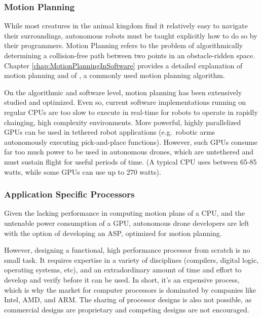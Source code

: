 
    \subsubsection{Motion Planning}
        
        While most creatures in the animal kingdom find it relatively easy to navigate their surroundings, autonomous robots must be taught explicitly how to do so by their programmers. Motion Planning refers to the problem of algorithmically determining a collision-free path between two points in an obstacle-ridden space. Chapter \ref{chap:MotionPlanningInSoftware} provides a detailed explanation of motion planning and of , a commonly used motion planning algorithm.

        On the algorithmic and software level, motion planning has been extensively studied and optimized. Even so, current software implementations running on regular \glspl{CPU} are too slow to execute in \gls{real-time} for robots to operate in rapidly chainging, high complexity environments. More powerful, highly parallelized \glspl{GPU} can be used in tethered robot applications (e.g.\ robotic arms autonomously executing pick-and-place functions). However, such \glspl{GPU} consume far too much power to be used in autonomous drones, which are untethered and must sustain flight for useful periods of time. (A typical \gls{CPU} uses between 65-85 watts, while some \glspl{GPU} can use up to 270 watts).

        
    \subsubsection{Application Specific Processors}

        Given the lacking performance in computing motion plans of a \gls{CPU}, and the untenable power consumption of a \gls{GPU}, autonomous drone developers are left with the option of developing an \gls{ASP}, optimized for motion planning.

        However, designing a functional, high performance processor from scratch is no small task. It requires expertise in a variety of disciplines (compilers, digital logic, operating systems, etc), and an extradordinary amount of time and effort to develop and verify before it can be used. In short, it's an expensive process, which is why the market for computer processors is dominated by companies like Intel, AMD, and ARM. The sharing of processor designs is also not possible, as commercial designs are proprietary and competing designs are not encouraged.

